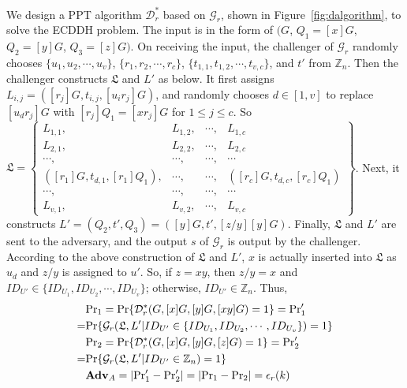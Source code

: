 We design a PPT algorithm $\mathcal{D}^*_r$ based on $\mathcal{G}_r$, shown in Figure~\ref{fig:dalgorithm}, to solve the ECDDH problem.
The input is in the form of $(G$, $Q_1=[x]G$, $Q_2=[y]G$, $Q_3=[z]G)$.
On receiving the input, the challenger of $\mathcal{G}_r$ randomly chooses
 $\{u_1, u_2, \cdots, u_v\}$, $\{r_1, r_2, \cdots, r_c\}$, $\{t_{1, 1}, t_{1, 2}, \cdots, t_{v, c}\}$, and $t'$ from $\mathbb{Z}_n$.
Then the challenger constructs $\mathfrak{L}$ and $L'$ as below.
It first assigns $L_{i, j} = ([r_j]G, t_{i, j}, [u_ir_j]G)$, %
    and randomly chooses $d \in [1, v]$ to
 replace $[u_d r_j]G$ with $[r_j]Q_1=[xr_j]G$ for $1\leq j \leq c$.
So $\mathfrak{L}=\left \{ \begin{matrix}
L_{1,1},&L_{1,2},&\cdots,&L_{1,c}\\
L_{2,1},& L_{2,2},&\cdots,&L_{2,c}\\
\cdots,&\cdots,&\cdots,&\cdots\\
([r_{1}]G, t_{d, 1}, [r_{1}]Q_1),&\cdots,&\cdots,&([r_{c}]G, t_{d, c}, [r_{c}]Q_1)\\
\cdots,&\cdots,&\cdots,&\cdots\\
L_{v,1},&L_{v,2},&\cdots,&L_{v,c}
\end{matrix}\right\}$.
%
Next, it constructs $L' = (Q_2, t', Q_3) = ([y]G, t', [z/y][y]G)$.
Finally,
    $\mathfrak{L}$ and $L'$ are sent to the adversary,
        and the output $s$ of $\mathcal{G}_r$ is output by the challenger.
According to the above construction of $\mathfrak{L}$ and $L'$,
    $x$ is actually inserted into $\mathfrak{L}$ as $u_d$
    and $z/y$ is assigned to $u'$.
So, if $z = xy$, then $z/y=x$ and $ID_{U'} \in \{ID_{U_1}, ID_{U_2}, \cdots, ID_{U_v}\}$;
    otherwise, $ID_{U'} \in \mathbb{Z}_n$.
Thus,
\begin{align*}
&{\rm Pr}_1={\rm Pr}\{\mathcal{D}^*_r(G, [x]G, [y]G, [xy]G)=1\}={\rm Pr}'_1 \\=&  {\rm Pr}\{\mathcal{G}_r(\mathfrak{L}, L'|ID_{U'} \in \{ID_{U_1}, ID_{U_2}, \cdots, ID_{U_v}\})=1\} \\
&{\rm Pr}_2={\rm Pr}\{\mathcal{D}^*_r(G, [x]G, [y]G, [z]G)=1\} ={\rm Pr}'_2 \\=&  {\rm Pr}\{\mathcal{G}_r(\mathfrak{L}, L'|ID_{U'} \in \mathbb{Z}_n)=1\}\\
&{\mathbf{Adv}}_A=|{\rm Pr}'_1-{\rm Pr}'_2|=|{\rm Pr}_1-{\rm Pr}_2|=\epsilon_{r}(k)
\end{align*}


